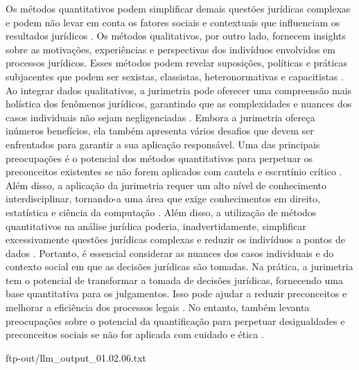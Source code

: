 \begin{agradecimentos}
    Os métodos quantitativos podem simplificar demais questões jurídicas complexas e podem não levar em conta os fatores sociais e contextuais que influenciam os resultados jurídicos \cite{10.1590/dados.2022.65.3.267,10.1057/s41599 -020-0396-5}. Os métodos qualitativos, por outro lado, fornecem insights sobre as motivações, experiências e perspectivas dos indivíduos envolvidos em processos jurídicos. Esses métodos podem revelar suposições, políticas e práticas subjacentes que podem ser sexistas, classistas, heteronormativas e capacitistas \cite{10.1590/dados.2022.65.3.267,10.1057/s41599-020-0396-5}. Ao integrar dados qualitativos, a jurimetria pode oferecer uma compreensão mais holística dos fenômenos jurídicos, garantindo que as complexidades e nuances dos casos individuais não sejam negligenciadas \cite{10.1590/dados.2022.65.3.267,10.1057/s41599-020-0396-5}. Embora a jurimetria ofereça inúmeros benefícios, ela também apresenta vários desafios que devem ser enfrentados para garantir a sua aplicação responsável. Uma das principais preocupações é o potencial dos métodos quantitativos para perpetuar os preconceitos existentes se não forem aplicados com cautela e escrutínio crítico \cite{ccdacdfbcdaf,efbfffafaacadd}. Além disso, a aplicação da jurimetria requer um alto nível de conhecimento interdisciplinar, tornando-a uma área que exige conhecimentos em direito, estatística e ciência da computação \cite{ccdacdfbcdaf,efbfffafaacadd}. Além disso, a utilização de métodos quantitativos na análise jurídica poderia, inadvertidamente, simplificar excessivamente questões jurídicas complexas e reduzir os indivíduos a pontos de dados \cite{ccdacdfbcdaf,efbfffafaacadd}. Portanto, é essencial considerar as nuances dos casos individuais e do contexto social em que as decisões jurídicas são tomadas. Na prática, a jurimetria tem o potencial de transformar a tomada de decisões jurídicas, fornecendo uma base quantitativa para os julgamentos. Isso pode ajudar a reduzir preconceitos e melhorar a eficiência dos processos legais \cite{101111lsi12334}. No entanto, também levanta preocupações sobre o potencial da quantificação para perpetuar desigualdades e preconceitos sociais se não for aplicada com cuidado e ética \cite{101111lsi12334}. 
    
    ftp-out/llm_output_01.02.06.txt 
    

\end{agradecimentos}

